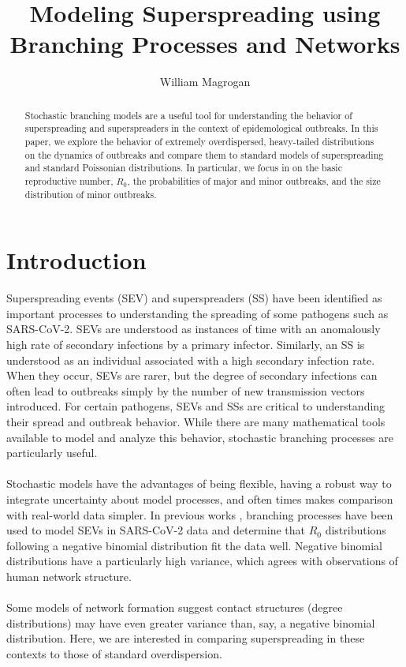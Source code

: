 \documentclass[11pt, twocolumn]{article}
\title{Modeling Superspreading using Branching Processes and Networks}
\author{William Magrogan}
\begin{document}
\maketitle

\begin{abstract}
Stochastic branching models are a useful tool for understanding the behavior of superspreading and superspreaders in the context of epidemological outbreaks. In this paper, we explore the behavior of extremely overdispersed, heavy-tailed distributions on the dynamics of outbreaks and compare them to standard models of superspreading and standard Poissonian distributions. In particular, we focus in on the basic reproductive number, $R_0$, the probabilities of major and minor outbreaks, and the size distribution of minor outbreaks.
\end{abstract}

\section*{Introduction}
Superspreading events (SEV) and superspreaders (SS) have been identified as important processes to understanding the spreading of some pathogens such as SARS-CoV-2. SEVs are understood as instances of time with an anomalously high rate of secondary infections by a primary infector. Similarly, an SS is understood as an individual associated with a high secondary infection rate. When they occur, SEVs are rarer, but the degree of secondary infections can often lead to outbreaks simply by the number of new transmission vectors introduced. For certain pathogens, SEVs and SSs are critical to understanding their spread and outbreak behavior. While there are many mathematical tools available to model and analyze this behavior, stochastic branching processes are particularly useful.\\ \\
Stochastic models have the advantages of being flexible, having a robust way to integrate uncertainty about model processes, and often times makes comparison with real-world data simpler. In previous works \cite{??}, branching processes have been used to model SEVs in SARS-CoV-2 data and determine that $R_0$ distributions following a negative binomial distribution fit the data well. Negative binomial distributions have a particularly high variance, which agrees with observations of human network structure. \\ \\
Some models of network formation \cite{barabasi, yule, polya} suggest contact structures (degree distributions) may have even greater variance than, say, a negative binomial distribution. Here, we are interested in comparing superspreading in these contexts to those of standard overdispersion.
\end{document}
